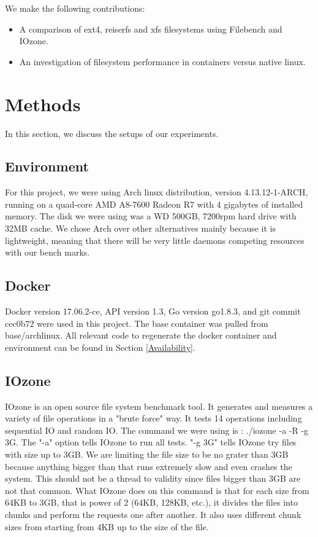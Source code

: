 \documentclass[letterpaper,twocolumn,10pt]{article}
\begin{document}
We make the following contributions:
\begin{itemize}
  \item A comparison of ext4, reiserfs and xfs filesystems using Filebench and IOzone.
  \item An investigation of filesystem performance in containers versus native linux.
\end{itemize}

\section{Methods}
In this section, we discuss the setups of our experiments.
\subsection{Environment}
For this project, we were using Arch linux distribution, version 4.13.12-1-ARCH, running on a quad-core AMD A8-7600 Radeon R7 with 4 gigabytes
 of installed memory. The disk we were using was a WD 500GB, 7200rpm hard drive with 32MB cache. We chose Arch over other alternatives 
 mainly because it is lightweight, meaning that there will be very little daemons competing resources with our bench marks. 

\subsection{Docker}
Docker version 17.06.2-ce, API version 1.3, Go version go1.8.3, and git commit cec0b72 were used in this project. The base container was pulled from base/archlinux. All relevant code to regenerate the docker container and environment can be found in Section \ref{Availability}.

\subsection{IOzone}
IOzone is an open source file system benchmark tool. It generates and measures a variety of file operations in a "brute force" way. It tests 
14 operations including sequential IO and random IO. The command we were using is : ./iozone -a -R -g 3G. The "-a" option tells IOzone
to run all tests. "-g 3G" tells IOzone try files with size up to 3GB. We are limiting the file size to be no grater than 3GB because anything
bigger than that runs extremely slow and even crashes the system. This should not be a thread to validity since files bigger than 3GB are not 
that common. What IOzone does on this command is that for each size from 64KB to 3GB, that is power of 2 (64KB, 128KB, etc.), it divides the 
files into chunks and perform the requests one after another. It also uses different chunk sizes from starting from 4KB up to the size of the file. 
\end{document}
